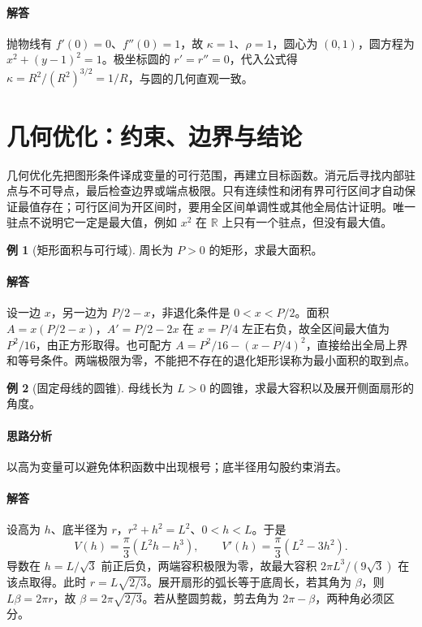 \documentclass[UTF8,fontset=fandol,12pt,oneside,openany]{ctexrep}
\newcommand{\R}{\mathbb R}
\theoremstyle{definition}
\newtheorem{example}{例}[chapter]
\begin{document}
\paragraph{解答}抛物线有 $f'(0)=0$、$f''(0)=1$，故 $\kappa=1$、$\rho=1$，圆心为 $(0,1)$，圆方程为 $x^2+(y-1)^2=1$。极坐标圆的 $r'=r''=0$，代入公式得 $\kappa=R^2/(R^2)^{3/2}=1/R$，与圆的几何直观一致。

\section{几何优化：约束、边界与结论}
\label{lec:09:optimization}
几何优化先把图形条件译成变量的可行范围，再建立目标函数。消元后寻找内部驻点与不可导点，最后检查边界或端点极限。只有连续性和闭有界可行区间才自动保证最值存在；可行区间为开区间时，要用全区间单调性或其他全局估计证明。唯一驻点不说明它一定是最大值，例如 $x^2$ 在 $\R$ 上只有一个驻点，但没有最大值。

\begin{example}[矩形面积与可行域]
周长为 $P>0$ 的矩形，求最大面积。
\end{example}
\paragraph{解答}设一边 $x$，另一边为 $P/2-x$，非退化条件是 $0<x<P/2$。面积 $A=x(P/2-x)$，$A'=P/2-2x$ 在 $x=P/4$ 左正右负，故全区间最大值为 $P^2/16$，由正方形取得。也可配方 $A=P^2/16-(x-P/4)^2$，直接给出全局上界和等号条件。两端极限为零，不能把不存在的退化矩形误称为最小面积的取到点。

\begin{example}[固定母线的圆锥]
母线长为 $L>0$ 的圆锥，求最大容积以及展开侧面扇形的角度。
\end{example}
\paragraph{思路分析}以高为变量可以避免体积函数中出现根号；底半径用勾股约束消去。
\paragraph{解答}设高为 $h$、底半径为 $r$，$r^2+h^2=L^2$、$0<h<L$。于是
\[V(h)=\frac\pi3(L^2h-h^3),\qquad V'(h)=\frac\pi3(L^2-3h^2).\]
导数在 $h=L/\sqrt3$ 前正后负，两端容积极限为零，故最大容积 $2\pi L^3/(9\sqrt3)$ 在该点取得。此时 $r=L\sqrt{2/3}$。展开扇形的弧长等于底周长，若其角为 $\beta$，则 $L\beta=2\pi r$，故 $\beta=2\pi\sqrt{2/3}$。若从整圆剪裁，剪去角为 $2\pi-\beta$，两种角必须区分。
\end{document}

